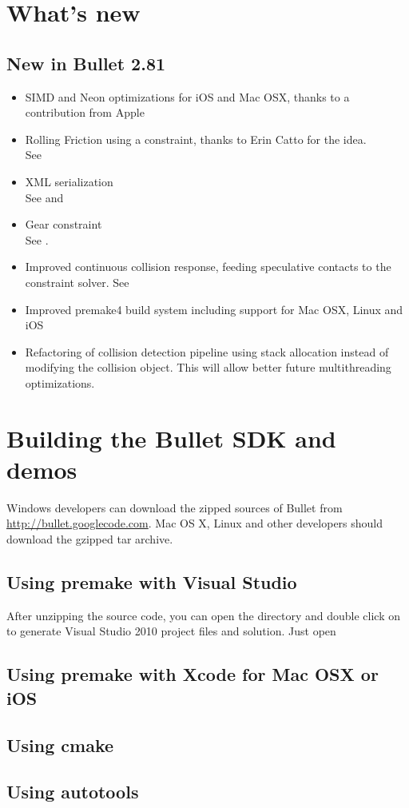 \section{What's new}
\subsection{New in Bullet 2.81}
\begin{itemize}
	\item SIMD and Neon optimizations for iOS and Mac OSX, thanks to a contribution from Apple
	\item Rolling Friction using a constraint, thanks to Erin Catto for the idea. \\See {}
	\item XML serialization\\See {} and 
	\item Gear constraint\\See {}.
	\item Improved continuous collision response, feeding speculative contacts to the constraint solver. See 
	\item Improved premake4 build system including support for Mac OSX, Linux and iOS
	\item Refactoring of collision detection pipeline using stack allocation instead of modifying the collision object. This will allow better future multithreading optimizations.
\end{itemize}

\section{Building the Bullet SDK and demos}
Windows developers can download the zipped sources of Bullet from \url{http://bullet.googlecode.com}. Mac OS X, Linux and other developers should download the gzipped tar archive.
\subsection{Using premake with Visual Studio}
After unzipping the source code, you can open the  directory and double click on  to generate Visual Studio 2010 project files and solution. Just open 
\subsection{Using premake with Xcode for Mac OSX or iOS}

\subsection{Using cmake}

\subsection{Using autotools}

